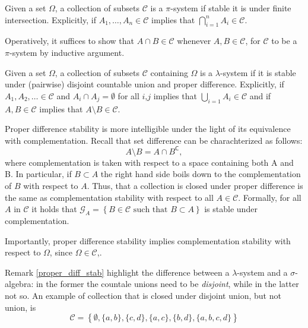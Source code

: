 \begin{my_definition}[$\pi$-system]
	Given a set $\Omega$, a collection of subsets $\mathcal{C}$ is a $\pi$-system if stable it is under finite intersection. Explicitly, if $A_1, \dots, A_n \in \mathcal{C}$ implies that $\bigcap^n_{i=1} A_i \in \mathcal{C}$.
\end{my_definition}
\begin{my_remark}
	Operatively, it suffices to show that $A \cap B \in \mathcal{C}$ whenever $A,B \in \mathcal{C}$, for $\mathcal{C}$ to be a $\pi$-system by inductive argument.
\end{my_remark}
\begin{my_definition}
	Given a set $\Omega$, a collection of subsets $\mathcal{C}$ containing $\Omega$ is a $\lambda$-system if it is stable under (pairwise) disjoint countable union and proper difference. Explicitly, if $A_1, A_2, \dots \in \mathcal{C}$ and $A_i \cap A_j = \emptyset$ for all $i$,$j$ implies that $\bigcup_{i=1} A_i \in \mathcal{C}$ and if $A,B \in \mathcal{C}$ implies that $A \setminus B \in \mathcal{C}$.
\end{my_definition}
\begin{my_remark}
	\label{proper_diff_stab}
	Proper difference stability is more intelligible under the light of its equivalence with complementation. Recall that set difference can be charachterized as follows:
	\[
		A \setminus B = A \cap B^\mathsf{C},
	\]
	where complementation is taken with respect to a space containing both A and B. In particular, if $B \subset A$ the right hand side boils down to the complementation of $B$ with respect to $A$. Thus, that a collection is closed under proper difference is the same as complementation stability with respect to all $A \in \mathcal{C}$. Formally, for all $A$ in $\mathcal{C}$ it holds that $\mathcal{G}_A=\left \{B \in \mathcal{C} \text{ such that } B \subset A \right \}$ is stable under complementation. 
	
	Importantly, proper difference stability implies complementation stability with respect to $\Omega$, since $\Omega \in \mathcal{C}$,.
\end{my_remark}
\begin{my_remark}
	Remark \ref{proper_diff_stab} highlight the difference between a $\lambda$-system and a $\sigma$-algebra: in the former the countale unions need to be \textit{disjoint}, while in the latter not so. An example of collection that is closed under disjoint union, but not union, is
	\[
		\mathcal{C}=\left \{ \emptyset, \{a,b\},\{c,d\},\{a,c\},\{b,d\}, \{a,b,c,d\} \right \}
	\]
\end{my_remark}
